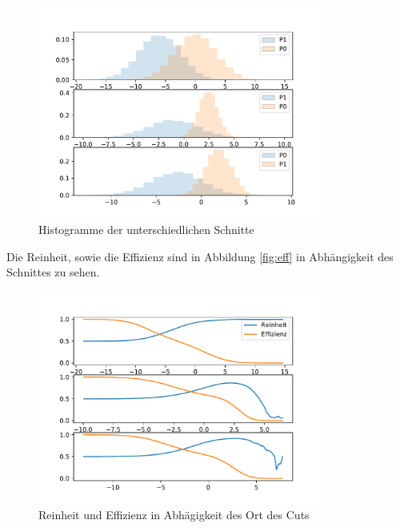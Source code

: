\begin{figure}[H]
  \centering
  \includegraphics[height=7cm]{Python/hist.pdf}
  \caption{Histogramme der unterschiedlichen Schnitte}
  \label{fig:d}
\end{figure}
Die Reinheit, sowie die Effizienz sind in Abbildung \ref{fig:eff} in Abhängigkeit des Schnittes zu sehen.
\begin{figure}[H]
  \centering
  \includegraphics[height=7cm]{Python/cuts.pdf}
  \caption{Reinheit und Effizienz in Abhägigkeit des Ort des Cuts}
  \label{fig:b}
\end{figure}







